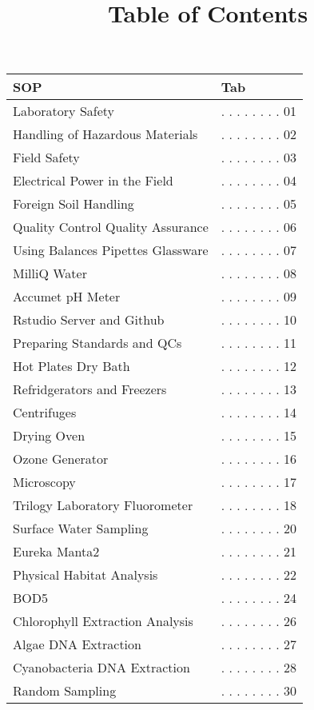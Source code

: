 \documentclass[18pt]{memoir}\usepackage[]{graphicx}\usepackage[]{color}
\title{Table of Contents}
\begin{document}
\begin{table}[ht]
\centering
\begin{tabular}{ll}
  \toprule
SOP & Tab \\ 
  \midrule
Laboratory Safety & . . . . . . . .  01 \\ 
  Handling of Hazardous Materials & . . . . . . . .  02 \\ 
  Field Safety & . . . . . . . .  03 \\ 
  Electrical Power in the Field & . . . . . . . .  04 \\ 
  Foreign Soil Handling & . . . . . . . .  05 \\ 
  Quality Control Quality Assurance & . . . . . . . .  06 \\ 
  Using Balances Pipettes Glassware & . . . . . . . .  07 \\ 
  MilliQ Water & . . . . . . . .  08 \\ 
  Accumet pH Meter & . . . . . . . .  09 \\ 
  Rstudio Server and Github & . . . . . . . .  10 \\ 
  Preparing Standards and QCs & . . . . . . . .  11 \\ 
  Hot Plates Dry Bath & . . . . . . . .  12 \\ 
  Refridgerators and Freezers & . . . . . . . .  13 \\ 
  Centrifuges & . . . . . . . .  14 \\ 
  Drying Oven & . . . . . . . .  15 \\ 
  Ozone Generator & . . . . . . . .  16 \\ 
  Microscopy & . . . . . . . .  17 \\ 
  Trilogy Laboratory Fluorometer & . . . . . . . .  18 \\ 
  Surface Water Sampling & . . . . . . . .  20 \\ 
  Eureka Manta2 & . . . . . . . .  21 \\ 
  Physical Habitat Analysis & . . . . . . . .  22 \\ 
  BOD5 & . . . . . . . .  24 \\ 
  Chlorophyll Extraction Analysis & . . . . . . . .  26 \\ 
  Algae DNA Extraction & . . . . . . . .  27 \\ 
  Cyanobacteria DNA Extraction & . . . . . . . .  28 \\ 
  Random Sampling & . . . . . . . .  30 \\ 

\end{tabular}
\end{table}
\end{document}
